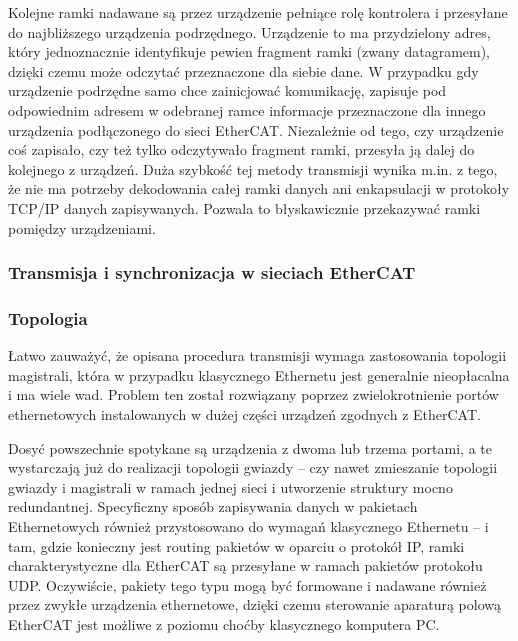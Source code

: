 Kolejne ramki nadawane są przez urządzenie pełniące rolę kontrolera i przesyłane do najbliższego urządzenia podrzędnego. Urządzenie to ma przydzielony adres, który jednoznacznie identyfikuje pewien fragment ramki (zwany datagramem), dzięki czemu może odczytać przeznaczone dla siebie dane. W przypadku gdy urządzenie podrzędne samo chce zainicjować komunikację, zapisuje pod odpowiednim adresem w odebranej ramce informacje przeznaczone dla innego urządzenia podłączonego do sieci EtherCAT. Niezależnie od tego, czy urządzenie coś zapisało, czy też tylko odczytywało fragment ramki, przesyła ją dalej do kolejnego z urządzeń. Duża szybkość tej metody transmisji wynika m.in. z tego, że nie ma potrzeby dekodowania całej ramki danych ani enkapsulacji w protokoły TCP/IP danych zapisywanych. Pozwala to błyskawicznie przekazywać ramki pomiędzy urządzeniami.


\subsubsection{Transmisja i synchronizacja w sieciach EtherCAT}

\subsubsection{Topologia}
Łatwo zauważyć, że opisana procedura transmisji wymaga zastosowania topologii magistrali, która w przypadku klasycznego Ethernetu jest generalnie nieopłacalna i ma wiele wad. Problem ten został rozwiązany poprzez zwielokrotnienie portów ethernetowych instalowanych w dużej części urządzeń zgodnych z EtherCAT.

Dosyć powszechnie spotykane są urządzenia z dwoma lub trzema portami, a te wystarczają już do realizacji topologii gwiazdy – czy nawet zmieszanie topologii gwiazdy i magistrali w ramach jednej sieci i utworzenie struktury mocno redundantnej. Specyficzny sposób zapisywania danych w pakietach Ethernetowych również przystosowano do wymagań klasycznego Ethernetu – i tam, gdzie konieczny jest routing pakietów w oparciu o protokół IP, ramki charakterystyczne dla EtherCAT są przesyłane w ramach pakietów protokołu UDP. Oczywiście, pakiety tego typu mogą być formowane i nadawane również przez zwykłe urządzenia ethernetowe, dzięki czemu sterowanie aparaturą polową EtherCAT jest możliwe z poziomu choćby klasycznego komputera PC.


